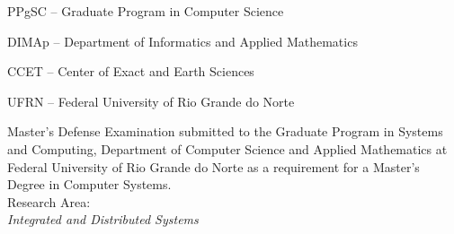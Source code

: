 
\instituicao
{
	PPgSC -- Graduate Program in Computer Science\par 
	DIMAp -- Department of Informatics and Applied Mathematics\par
   CCET -- Center of Exact and Earth Sciences\par
   UFRN -- Federal University of Rio Grande do Norte
}
	
\comentario
{
	Master's Defense Examination submitted to the Graduate Program in Systems and Computing, Department of Computer Science and Applied Mathematics at Federal University of Rio Grande do Norte as a requirement for a Master's Degree in Computer Systems.\bigskip\\
   Research Area: \\ \textit{Integrated and Distributed Systems}
}
		
	
\folhaderosto